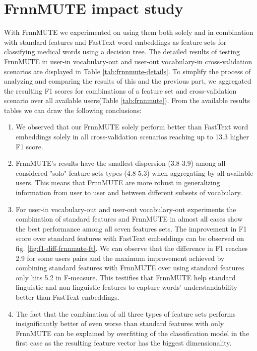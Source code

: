 \section{FrnnMUTE impact study}
\label{sec:frnnmute-study}

With FrnnMUTE we experimented on using them both solely and in combination with standard features and FastText word embeddings as feature sets for classifying medical words using a decision tree. The detailed results of testing FrnnMUTE in user-in vocabulary-out and user-out vocabulary-in cross-validation scenarios are displayed in Table \ref{tab:frnnmute-details}. To simplify the process of analyzing and comparing the results of this and the previous part, we aggregated the resulting F1 scores for combinations of a feature set and cross-validation scenario over all available users(Table \ref{tab:frnnmute}).  From the available results tables we can draw the following conclusions:
\begin{enumerate}
    \item We observed that our FrnnMUTE solely perform better than FastText word embeddings solely in all cross-validation scenarios reaching up to 13.3 higher F1 score. 
    \item FrnnMUTE's results have the smallest dispersion (3.8-3.9)  among all considered "solo" feature sets types (4.8-5.3) when aggregating by all available users. This means that FrnnMUTE are more robust in generalizing information from user to user and between different subsets of vocabulary.
    \item For user-in vocabulary-out and user-out vocabulary-out experiments the combination of standard features and FrnnMUTE in almost all cases show the best performance among all seven features sets. The improvement in F1 score over standard features with  FastText embeddings can be observed on fig. \ref{fig:f1-diff-frnnmute-ft}. We can observe that the difference in F1 reaches 2.9 for some users pairs and the maximum improvement achieved by combining standard features with FrnnMUTE over using standard features only hits 5.2 in F-measure.  This testifies that FrnnMUTE help standard linguistic and non-linguistic features to capture words' understandability better than FastText embeddings.  
    \item The fact that the combination of all three types of feature sets performs insignificantly better of even worse than standard features with only FrnnMUTE can be explained by overfitting of the classification model in the first case as the resulting feature vector has the biggest dimensionality.
\end{enumerate}

